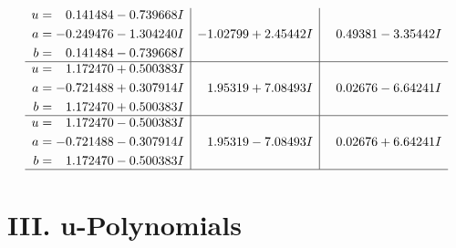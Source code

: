 \documentclass[1p]{elsarticle_modified}
\theoremstyle{definition}
\begin{document}
$$\begin{array}{c|c|c}
\begin{aligned}
u &= \phantom{-}0.141484 - 0.739668 I \\
a &= -0.249476 - 1.304240 I \\
b &= \phantom{-}0.141484 - 0.739668 I\end{aligned}
 & -1.02799 + 2.45442 I & \phantom{-}0.49381 - 3.35442 I \\ \hline\begin{aligned}
u &= \phantom{-}1.172470 + 0.500383 I \\
a &= -0.721488 + 0.307914 I \\
b &= \phantom{-}1.172470 + 0.500383 I\end{aligned}
 & \phantom{-}1.95319 + 7.08493 I & \phantom{-}0.02676 - 6.64241 I \\ \hline\begin{aligned}
u &= \phantom{-}1.172470 - 0.500383 I \\
a &= -0.721488 - 0.307914 I \\
b &= \phantom{-}1.172470 - 0.500383 I\end{aligned}
 & \phantom{-}1.95319 - 7.08493 I & \phantom{-}0.02676 + 6.64241 I\\
 \hline 
 \end{array}$$\newpage
\newpage\renewcommand{\arraystretch}{1}
\centering \section*{ III. u-Polynomials}
\end{document}
